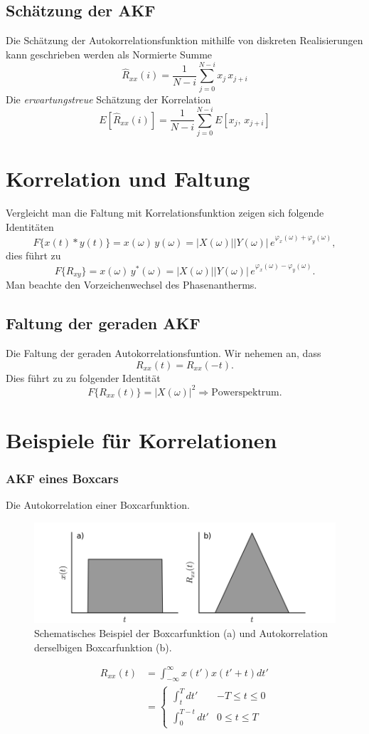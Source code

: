 \subsection{Schätzung der AKF}
Die Schätzung der Autokorrelationsfunktion mithilfe von diskreten Realisierungen kann geschrieben werden als Normierte Summe
\[
\hat R_{xx}(i) = \frac{1}{N-i} \sum_{j=0}^{N-i} x_j\,x_{j+i}
\]
Die \textit{erwartungstreue} Schätzung der Korrelation
\[
E[\hat R_{xx}(i)] = \frac{1}{N-i} \sum_{j=0}^{N-i} E[x_j,\,x_{j+i}]
\]

\section{Korrelation und Faltung}
Vergleicht man die Faltung mit Korrelationsfunktion zeigen sich folgende Identitäten
\[
F\{x(t) \ast y(t)\} = x(\omega)\,y(\omega) = |X(\omega)| |Y(\omega)|\,e^{\varphi_x(\omega) + \varphi_y(\omega)},
\]
dies führt zu
\[
F\{R_{xy}\} = x(\omega)\,y^*(\omega) = |X(\omega)| |Y(\omega)|\,e^{\varphi_x(\omega) - \varphi_y(\omega)}.
\]
Man beachte den Vorzeichenwechsel des Phasenantherms.

\subsection*{Faltung der geraden AKF}
Die Faltung der geraden Autokorrelationsfuntion. Wir nehemen an, dass
\[
R_{xx}(t) = R_{xx}(-t).
\]
Dies führt zu zu folgender Identität
\[
F\{R_{xx}(t)\} = |X(\omega)|^2 \Rightarrow \textrm{Powerspektrum}.
\]

\section{Beispiele für Korrelationen}

\subsubsection*{AKF eines Boxcars}
Die Autokorrelation einer Boxcarfunktion.
\begin{figure}[h!]
\centering
\includegraphics[width=.9\tw]{fig/09-Korrelation/01-example_boxcar.png}
\caption{Schematisches Beispiel der Boxcarfunktion (a) und Autokorrelation derselbigen Boxcarfunktion (b).}
\end{figure}
\begin{align*}
R_{xx}(t) & = \int_{-\infty}^\infty x(t') x(t'+t) dt' \\
& = \begin{cases}
 \int_t^T dt' & -T \leq t \leq 0\\
 \int_0^{T-t} dt' & 0  \leq t \leq T\
 \end{cases}
\end{align*}


